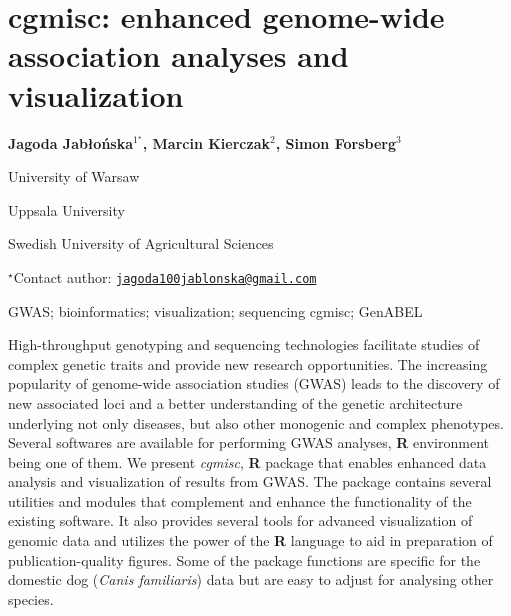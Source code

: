 \documentclass[\main/boa.tex]{subfiles}
\begin{document}
\section{cgmisc: enhanced genome-wide association analyses and visualization}

\begin{center}
  {\bf Jagoda Jabłońska$^{1^\star}$, Marcin Kierczak$^{2}$, Simon Forsberg$^{3}$}
\end{center}

\vskip 0.3cm

\begin{affiliations}
\begin{enumerate}
\begin{minipage}{0.915\textwidth}
\centering
\item University of Warsaw \\[-2pt]
\item Uppsala University \\[-2pt]
\item Swedish University of Agricultural Sciences \\[-2pt]
\end{minipage}
\end{enumerate}
$^\star$Contact author: \href{mailto:jagoda100jablonska@gmail.com}{\nolinkurl{jagoda100jablonska@gmail.com}}\\
\end{affiliations}

\vskip 0.5cm

\begin{minipage}{0.915\textwidth}
\keywords GWAS; bioinformatics; visualization; sequencing
\packages cgmisc; GenABEL
\end{minipage}

\vskip 0.8cm

High-throughput genotyping and sequencing technologies facilitate
studies of complex genetic traits and provide new research
opportunities. The increasing popularity of genome-wide association
studies (GWAS) leads to the discovery of new associated loci and a
better understanding of the genetic architecture underlying not only
diseases, but also other monogenic and complex phenotypes. Several
softwares are available for performing GWAS analyses, \textbf{R}
environment being one of them. We present \emph{cgmisc}, \textbf{R}
package that enables enhanced data analysis and visualization of results
from GWAS. The package contains several utilities and modules that
complement and enhance the functionality of the existing software. It
also provides several tools for advanced visualization of genomic data
and utilizes the power of the \textbf{R} language to aid in preparation
of publication-quality figures. Some of the package functions are
specific for the domestic dog (\emph{Canis familiaris}) data but are
easy to adjust for analysing other species.
\end{document}
